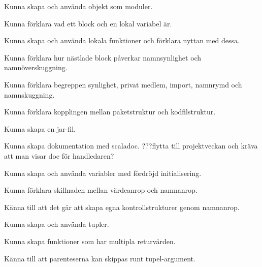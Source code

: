 
\item Kunna skapa och använda objekt som moduler.
\item Kunna förklara vad ett block och en lokal variabel är.
\item Kunna skapa och använda lokala funktioner och förklara nyttan med dessa.
\item Kunna förklara hur nästlade block påverkar namnsynlighet och namnöverskuggning.
\item Kunna förklara begreppen synlighet, privat medlem, import, namnrymd och namnskuggning.

\item Kunna förklara kopplingen mellan paketstruktur och kodfilstruktur.
\item Kunna skapa en jar-fil.

\item Kunna skapa dokumentation med scaladoc. \TODO ???flytta till projektveckan och kräva att man visar doc för handledaren?

\item Kunna skapa och använda variabler med fördröjd initialisering.
\item Kunna förklara skillnaden mellan värdeanrop och namnanrop.
\item Känna till att det går att skapa egna kontrollstrukturer genom namnanrop.

\item Kunna skapa och använda tupler.
\item Kunna skapa funktioner som har multipla returvärden.
\item Känna till att parenteserna kan skippas runt tupel-argument.

